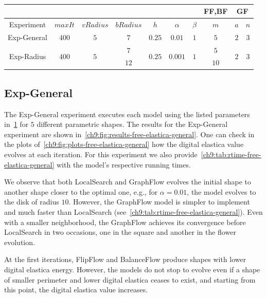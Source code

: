\begin{table}
\centering
\begin{tabular}{|c|c|c|c|c|c|c|c|c|c|}
\cline{8-10}
\multicolumn{7}{c|}{} & FF,BF & \multicolumn{2}{|c|}{GF}\\
\hline
Experiment & $maxIt$ & $vRadius$ & $bRadius$ & $h$ & $\alpha$ & $\beta$  & $m$ & $a$ & $n$ \\
\hline
Exp-General & $400$ & $5$ & $7$ & $0.25$ & $0.01$ & $1$  & $5$ & $2$ & $3$ \\
\hline
\multirow{2}{*}{Exp-Radius} & \multirow{2}{*}{$400$} & \multirow{2}{*}{$5$} & $7$ & \multirow{2}{*}{$0.25$} &  \multirow{2}{*}{$0.001$} & \multirow{2}{*}{$1$}  & $5$ & \multirow{2}{*}{$2$} & \multirow{2}{*}{$3$} \\
& &  & $12$ & &  & & $10$ & &  \\
\hline
\end{tabular}
\caption{}
\label{ch9:tab:free-elastica-parameters-summary}
\end{table}

\subsection{Exp-General}

  The Exp-General experiment executes each model using the listed parameters in~\cref{ch9:tab:free-elastica-parameters-summary} for $5$ different parametric shapes. The results for the Exp-General experiment are shown in~\cref{ch9:fig:results-free-elastica-general}. One can check in the plots of~\cref{ch9:fig:plots-free-elastica-general} how the digital elastica value evolves at each iteration. For this experiment we also provide~\cref{ch9:tab:rtime-free-elastica-general} with the model's respective running times.
  

We observe that both LocalSearch and GraphFlow evolves the initial shape to another shape closer to the optimal one, e.g., for $\alpha=0.01$, the model evolves to the disk of radius $10$. However, the GraphFlow model is simpler to implement and much faster than LocalSearch (see~\cref{ch9:tab:rtime-free-elastica-general}). Even with a smaller neighborhood, the GraphFlow achieves its convergence before LocalSearch in two occasions, one in the square and another in the flower evolution.

At the first iterations, FlipFlow and BalanceFlow produce shapes with lower digital elastica energy. However, the models do not stop to evolve even if a shape of smaller perimeter and lower digital elastica ceases to exist, and starting from this point, the digital elastica value increases.


